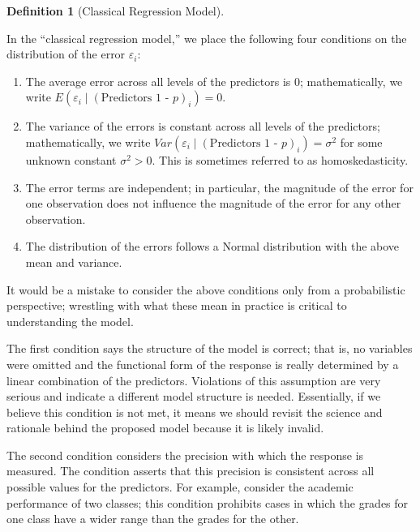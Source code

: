 \documentclass[
  letterpaper,
  DIV=11,
  numbers=noendperiod]{scrreprt}
\providecommand{\tightlist}{%
  \setlength{\itemsep}{0pt}\setlength{\parskip}{0pt}}\usepackage{longtable,booktabs,array}
\theoremstyle{definition}
\newtheorem{definition}{Definition}[chapter]
\theoremstyle{definition}
\theoremstyle{remark}
\begin{document}
\begin{definition}[Classical Regression
Model]\protect\hypertarget{def-classical-regression}{}\label{def-classical-regression}

In the ``classical regression model,'' we place the following four
conditions on the distribution of the error \(\varepsilon_i\):

\begin{enumerate}
\def\labelenumi{\arabic{enumi}.}
\tightlist
\item
  The average error across all levels of the predictors is 0;
  mathematically, we write
  \(E\left(\varepsilon_i \mid (\text{Predictors 1 - }p)_i\right) = 0\).
\item
  The variance of the errors is constant across all levels of the
  predictors; mathematically, we write
  \(Var\left(\varepsilon_i \mid (\text{Predictors 1 - }p)_i\right) = \sigma^2\)
  for some unknown constant \(\sigma^2 > 0\). This is sometimes referred
  to as homoskedasticity.
\item
  The error terms are independent; in particular, the magnitude of the
  error for one observation does not influence the magnitude of the
  error for any other observation.
\item
  The distribution of the errors follows a Normal distribution with the
  above mean and variance.
\end{enumerate}

\end{definition}

It would be a mistake to consider the above conditions only from a
probabilistic perspective; wrestling with what these mean in practice is
critical to understanding the model.

The first condition says the structure of the model is correct; that is,
no variables were omitted and the functional form of the response is
really determined by a linear combination of the predictors. Violations
of this assumption are very serious and indicate a different model
structure is needed. Essentially, if we believe this condition is not
met, it means we should revisit the science and rationale behind the
proposed model because it is likely invalid.

The second condition considers the precision with which the response is
measured. The condition asserts that this precision is consistent across
all possible values for the predictors. For example, consider the
academic performance of two classes; this condition prohibits cases in
which the grades for one class have a wider range than the grades for
the other.
\end{document}
